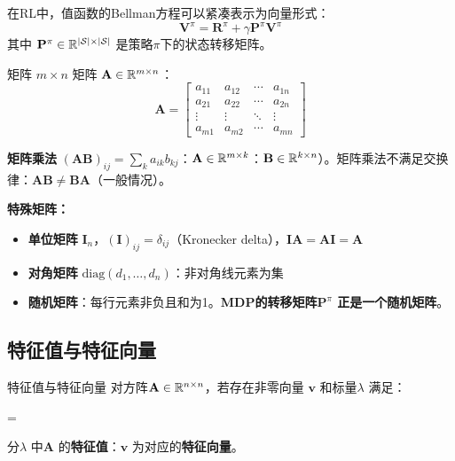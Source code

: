 在RL中，值函数的Bellman方程可以紧凑表示为向量形式：
\[
\mathbf{V}^{\pi} = \mathbf{R}^{\pi} + \gamma \mathbf{P}^{\pi} \mathbf{V}^{\pi}
\]
其中 $\mathbf{P}^{\pi} \in \mathbb{R}^{|\mathcal{S}| \times |\mathcal{S}|}$ 是策略$\pi$下的状态转移矩阵。

\begin{mydefinition}{矩阵}
$m \times n$ 矩阵 $\mathbf{A} \in \mathbb{R}^{m \times n}$：
\[
\mathbf{A} = \begin{bmatrix}
a_{11} & a_{12} & \cdots & a_{1n} \\
a_{21} & a_{22} & \cdots & a_{2n} \\
\vdots & \vdots & \ddots & \vdots \\
a_{m1} & a_{m2} & \cdots & a_{mn}
\end{bmatrix}
\]
\end{mydefinition}

\textbf{矩阵乘法} $(\mathbf{AB})_{ij} = \sum_{k} a_{ik} b_{kj}$：$\mathbf{A} \in \mathbb{R}^{m \times k}$：$\mathbf{B} \in \mathbb{R}^{k \times n}$）。矩阵乘法不满足交换律：$\mathbf{AB} \neq \mathbf{BA}$（一般情况）。

\textbf{特殊矩阵：}
\begin{itemize}
    \item \textbf{单位矩阵} $\mathbf{I}_n$，$(\mathbf{I})_{ij} = \delta_{ij}$（Kronecker delta），$\mathbf{I}\mathbf{A} = \mathbf{A}\mathbf{I} = \mathbf{A}$
    \item \textbf{对角矩阵} $\mathrm{diag}(d_1, \dots, d_n)$：非对角线元素为集
    \item \textbf{随机矩阵}：每行元素非负且和为1。\textbf{MDP的转移矩阵$\mathbf{P}^{\pi}$ 正是一个随机矩阵}。
\end{itemize}

\subsection{特征值与特征向量}

\begin{mydefinition}{特征值与特征向量}
对方阵$\mathbf{A} \in \mathbb{R}^{n \times n}$，若存在非零向量 $\mathbf{v}$ 和标量$\lambda$ 满足：
\begin{myformula}
  = \lambda {}
\end{myformula}
分$\lambda$ 中$\mathbf{A}$ 的\textbf{特征值}：$\mathbf{v}$ 为对应的\textbf{特征向量}。
\end{mydefinition}

